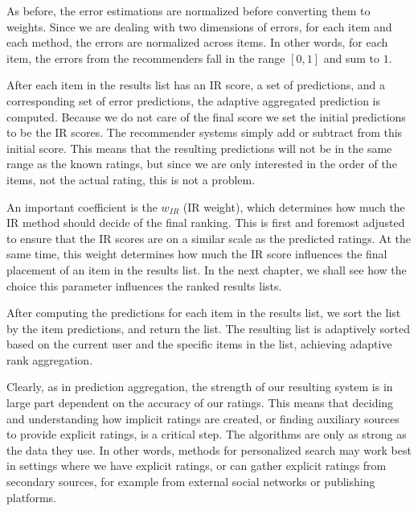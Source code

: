 As before, the error estimations are normalized before converting them to weights.
Since we are dealing with two dimensions of errors, for each item and each method,
the errors are normalized across items.
In other words, for each item, the errors from the recommenders fall in the range $[0,1]$ and sum to $1$.

After each item in the results list has an IR score, a set of predictions, and a corresponding set of 
error predictions, the adaptive aggregated prediction is computed. 
Because we do not care of the final score we set the initial predictions to be the IR scores.
The recommender systems simply add or subtract from this initial score.
This means that the resulting predictions will not be in the same range as the known ratings,
but since we are only interested in the order of the items, not the actual rating, this is not a problem.

An important coefficient is the $w_{IR}$ (IR weight),
which determines how much the IR method should decide of the final ranking.
This is first and foremost adjusted to ensure that the IR scores
are on a similar scale as the predicted ratings.
At the same time, this weight determines how 
much the IR score influences the final placement of an item in the results list.
In the next chapter, we shall see how the choice this parameter 
influences the ranked results lists.

After computing the predictions for each item in the results list, 
we sort the list by the item predictions, and return the list.
The resulting list is adaptively sorted based on the current user and the specific items in the list,
achieving adaptive rank aggregation.

Clearly, as in prediction aggregation, the strength of our resulting system is in large part dependent on the accuracy of our ratings.
This means that deciding and understanding how implicit ratings are created, or 
finding auxiliary sources to provide explicit ratings, is a critical step.
The algorithms are only as strong as the data they use.
In other words, methods for personalized search may work best in settings where we have explicit ratings,
or can gather explicit ratings from secondary sources, for example from external social networks or publishing platforms.


